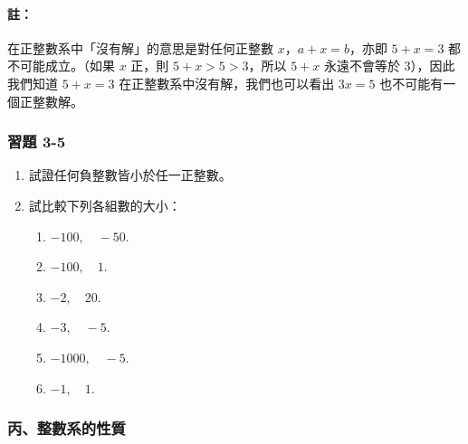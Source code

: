 \paragraph{註：}在正整數系中「沒有解」的意思是對任何正整數 $x$，$a+x=b$，亦即 $5+x=3$ 都不可能成立。（如果 $x$ 正，則 $5+x > 5 > 3$，所以 $5+x$ 永遠不會等於 $3$），因此我們知道 $5+x=3$ 在正整數系中沒有解，我們也可以看出 $3x=5$ 也不可能有一個正整數解。

\subsubsection*{習題 3-5}\label{sec:ex3-5}

\begin{enumerate}[1., leftmargin=2em]
  \item 試證任何負整數皆小於任一正整數。
  \item 試比較下列各組數的大小：
  \begin{enumerate}[(1)]
    \item $-100, \quad -50$.
    \item $-100, \quad 1$.
    \item $-2, \quad 20$.
    \item $-3, \quad -5$.
    \item $-1000, \quad -5$.
    \item $-1, \quad 1$.
  \end{enumerate}
\end{enumerate}

\subsubsection*{丙、整數系的性質}\label{subsec:int_properties}

